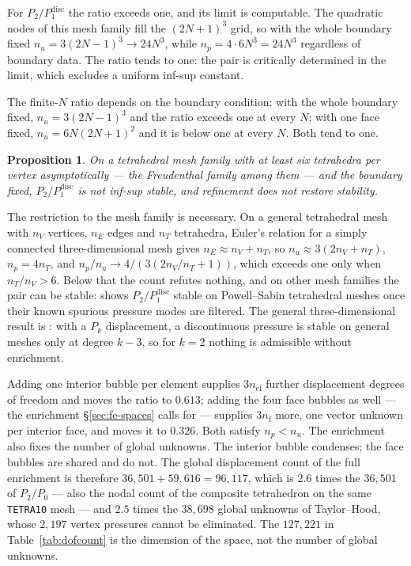 \documentclass[11pt]{article}
\newcommand{\code}[1]{\texttt{#1}}
\theoremstyle{definition}
\theoremstyle{plain}
\newtheorem{proposition}{Proposition}
\begin{document}
For $P_2/P_1^{\mathrm{disc}}$ the ratio exceeds one, and its limit is
computable. The quadratic nodes of this mesh family fill the $(2N+1)^3$
grid, so with the whole boundary fixed $n_u = 3(2N-1)^3 \to 24N^3$, while
$n_p = 4 \cdot 6N^3 = 24N^3$ regardless of boundary data. The ratio tends to
one: the pair is critically determined in the limit, which excludes a uniform
inf-sup constant.

The finite-$N$ ratio depends on the boundary condition: with the whole
boundary fixed, $n_u = 3(2N-1)^3$ and the ratio exceeds one at every $N$; with
one face fixed, $n_u = 6N(2N+1)^2$ and it is below one at every $N$. Both tend
to one.

\begin{proposition}
On a tetrahedral mesh family with at least six tetrahedra per vertex
asymptotically --- the Freudenthal family among them --- and the boundary
fixed, $P_2/P_1^{\mathrm{disc}}$ is not inf-sup stable, and refinement does not
restore stability.
\end{proposition}

The restriction to the mesh family is necessary. On a general tetrahedral mesh
with $n_V$ vertices, $n_E$ edges and $n_T$ tetrahedra, Euler's relation for a
simply connected three-dimensional mesh gives $n_E \approx n_V + n_T$, so
$n_u \approx 3(2n_V + n_T)$, $n_p = 4n_T$, and
$n_p/n_u \to 4/(3(2n_V/n_T + 1))$, which exceeds one only when
$n_T/n_V > 6$. Below that the count refutes nothing, and on other mesh families
the pair can be stable: \citet{Zhang:2011} shows $P_2/P_1^{\mathrm{disc}}$ stable on Powell--Sabin
tetrahedral meshes once their known spurious pressure modes are filtered. The
general three-dimensional result is \citet[Remark~8.6.2]{BoffiBrezziFortin:2013}:
with a $P_k$ displacement, a discontinuous pressure is stable on general meshes
only at degree $k - 3$, so for $k = 2$ nothing is admissible without enrichment.

Adding one interior bubble per element supplies $3n_{\mathrm{el}}$ further
displacement degrees of freedom and moves the ratio to $0.613$; adding the four
face bubbles as well --- the enrichment \S\ref{sec:fe-spaces} calls for ---
supplies $3n_{\mathrm{f}}$ more, one vector unknown per interior face,
and moves it to $0.326$. Both satisfy $n_p < n_u$. The enrichment also fixes
the number of global unknowns. The interior bubble
condenses; the face bubbles are shared and do not. The global displacement
count of the full enrichment is therefore $36{,}501 + 59{,}616 = 96{,}117$,
which is $2.6$ times the $36{,}501$ of $P_2/P_0$ --- also the nodal count of
the composite tetrahedron on the same \code{TETRA10} mesh --- and $2.5$ times
the $38{,}698$ global unknowns of Taylor--Hood, whose $2{,}197$ vertex pressures
cannot be eliminated. The $127{,}221$ in Table~\ref{tab:dofcount} is the
dimension of the space, not the number of global unknowns.
\end{document}
